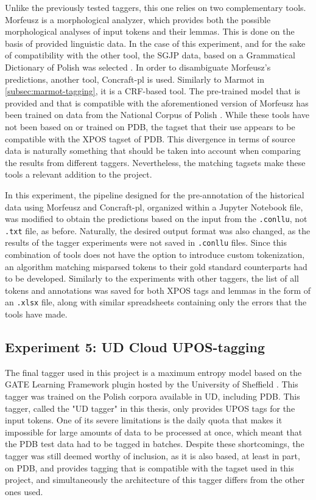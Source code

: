Unlike the previously tested taggers, this one relies on two complementary tools. Morfeusz is a morphological analyzer, which provides both the possible morphological analyses of input tokens and their lemmas. This is done on the basis of provided linguistic data. In the case of this experiment, and for the sake of compatibility with the other tool, the SGJP data, based on a Grammatical Dictionary of Polish was selected \citep{sal:etal:15, kie:wol:17:morf}. In order to disambiguate Morfeusz's predictions, another tool, Concraft-pl is used. Similarly to Marmot in \autoref{subsec:marmot-tagging}, it is a CRF-based tool. The pre-trained model that is provided and that is compatible with the aforementioned version of Morfeusz has been trained on data from the National Corpus of Polish \citep{nkjp, waszczuk-2012-harnessing, waszczuk2018morphosyntactic}. While these tools have not been based on or trained on PDB, the tagset that their use appears to be compatible with the XPOS tagset of PDB. This divergence in terms of source data is naturally something that should be taken into account when comparing the results from different taggers. Nevertheless, the matching tagsets make these tools a relevant addition to the project.

In this experiment, the pipeline designed for the pre-annotation of the historical data using Morfeusz and Concraft-pl, organized within a Jupyter Notebook file, was modified to obtain the predictions based on the input from the \texttt{.conllu}, not \texttt{.txt} file, as before. Naturally, the desired output format was also changed, as the results of the tagger experiments were not saved in \texttt{.conllu} files. Since this combination of tools does not have the option to introduce custom tokenization, an algorithm matching misparsed tokens to their gold standard counterparts had to be developed. Similarly to the experiments with other taggers, the list of all tokens and annotations was saved for both XPOS tags and lemmas in the form of an \texttt{.xlsx} file, along with similar spreadsheets containing only the errors that the tools have made.

\subsection{Experiment 5: UD Cloud UPOS-tagging}
\label{subsec:ud-tagging}

The final tagger used in this project is a maximum entropy model based on the GATE Learning Framework plugin hosted by the University of Sheffield \citep{gatecloud}. This tagger was trained on the Polish corpora available in UD, including PDB. This tagger, called the "UD tagger" in this thesis, only provides UPOS tags for the input tokens. One of its severe limitations is the daily quota that makes it impossible for large amounts of data to be processed at once, which meant that the PDB test data had to be tagged in batches. Despite these shortcomings, the tagger was still deemed worthy of inclusion, as it is also based, at least in part, on PDB, and provides tagging that is compatible with the tagset used in this project, and simultaneously the architecture of this tagger differs from the other ones used.

